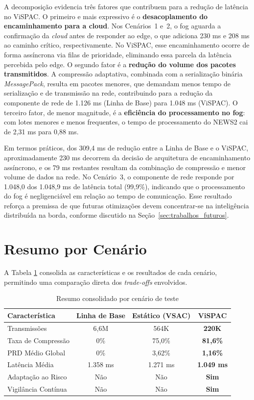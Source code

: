 \documentclass[twoside,english,brazilian]{UNISINOSmonografia}
\begin{document}
A decomposição evidencia três fatores que contribuem para a redução de latência no ViSPAC. O primeiro e mais expressivo é o \textbf{desacoplamento do encaminhamento para a cloud}. Nos Cenários~1 e~2, o fog aguarda a confirmação da \textit{cloud} antes de responder ao edge, o que adiciona 230 ms e 208 ms ao caminho crítico, respectivamente. No ViSPAC, esse encaminhamento ocorre de forma assíncrona via filas de prioridade, eliminando essa parcela da latência percebida pelo edge. O segundo fator é a \textbf{redução do volume dos pacotes transmitidos}. A compressão adaptativa, combinada com a serialização binária \textit{MessagePack}, resulta em pacotes menores, que demandam menos tempo de serialização e de transmissão na rede, contribuindo para a redução da componente de rede de 1.126 ms (Linha de Base) para 1.048 ms (ViSPAC). O terceiro fator, de menor magnitude, é a \textbf{eficiência do processamento no fog}: com lotes menores e menos frequentes, o tempo de processamento do NEWS2 cai de 2,31 ms para 0,88 ms.

Em termos práticos, dos 309,4 ms de redução entre a Linha de Base e o ViSPAC, aproximadamente 230 ms decorrem da decisão de arquitetura de encaminhamento assíncrono, e os 79 ms restantes resultam da combinação de compressão e menor volume de dados na rede. No Cenário~3, o componente de rede responde por 1.048,0 dos 1.048,9 ms de latência total (99,9\%), indicando que o processamento do fog é negligenciável em relação ao tempo de comunicação. Esse resultado reforça a premissa de que futuras otimizações devem concentrar-se na inteligência distribuída na borda, conforme discutido na Seção~\ref{sec:trabalhos_futuros}.

\section{Resumo por Cenário}
A Tabela \ref{tab:resumo_cenario} consolida as características e os resultados de cada cenário, permitindo uma comparação direta dos \textit{trade-offs} envolvidos.

\begin{table}[!ht]
\centering
\caption{Resumo consolidado por cenário de teste}
\label{tab:resumo_cenario}
\footnotesize
\begin{tabular}{|l|c|c|c|}
\hline
\textbf{Característica} & \textbf{Linha de Base} & \textbf{Estático (VSAC)} & \textbf{ViSPAC} \\ \hline
Transmissões & 6,6M & 564K & \textbf{220K} \\ \hline
Taxa de Compressão & 0\% & 75,0\% & \textbf{81,6\%} \\ \hline
PRD Médio Global & 0\% & 3,62\% & \textbf{1,16\%} \\ \hline
Latência Média & 1.358 ms & 1.271 ms & \textbf{1.049 ms} \\ \hline
Adaptação ao Risco & Não & Não & \textbf{Sim} \\ \hline
Vigilância Contínua & Não & Não & \textbf{Sim} \\ \hline
\end{tabular}
\end{table}
\end{document}
